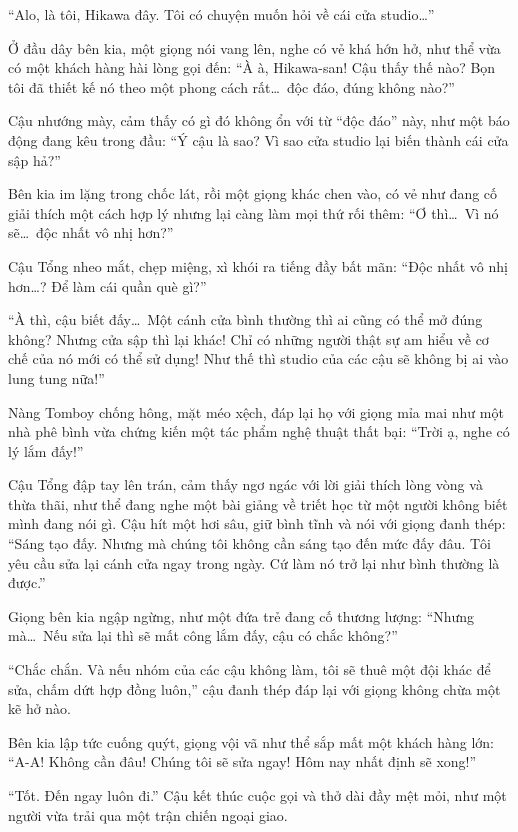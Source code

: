 \documentclass[../main.tex]{subfiles}
\begin{document}
``Alo, là tôi, Hikawa đây. Tôi có chuyện muốn hỏi về cái cửa studio\dots''

Ở đầu dây bên kia, một giọng nói vang lên, nghe có vẻ khá hớn hở, như thể vừa có một khách hàng hài lòng gọi đến: ``À à, Hikawa-san! Cậu thấy thế nào? Bọn tôi đã thiết kế nó theo một phong cách rất\dots\ độc đáo, đúng không nào?''

Cậu nhướng mày, cảm thấy có gì đó không ổn với từ ``độc đáo'' này, như một báo động đang kêu trong đầu: ``Ý cậu là sao? Vì sao cửa studio lại biến thành cái cửa sập hả?''

Bên kia im lặng trong chốc lát, rồi một giọng khác chen vào, có vẻ như đang cố giải thích một cách hợp lý nhưng lại càng làm mọi thứ rối thêm: ``Ơ thì\dots\ Vì nó sẽ\dots\ độc nhất vô nhị hơn?''

Cậu Tổng nheo mắt, chẹp miệng, xì khói ra tiếng đầy bất mãn: ``Độc nhất vô nhị hơn\dots? Để làm cái quần què gì?''

``À thì, cậu biết đấy\dots\ Một cánh cửa bình thường thì ai cũng có thể mở đúng không? Nhưng cửa sập thì lại khác! Chỉ có những người thật sự am hiểu về cơ chế của nó mới có thể sử dụng! Như thế thì studio của các cậu sẽ không bị ai vào lung tung nữa!''

Nàng Tomboy chống hông, mặt méo xệch, đáp lại họ với giọng mỉa mai như một nhà phê bình vừa chứng kiến một tác phẩm nghệ thuật thất bại: ``Trời ạ, nghe có lý lắm đấy!''

Cậu Tổng đập tay lên trán, cảm thấy ngơ ngác với lời giải thích lòng vòng và thừa thãi, như thể đang nghe một bài giảng về triết học từ một người không biết mình đang nói gì. Cậu hít một hơi sâu, giữ bình tĩnh và nói với giọng đanh thép: ``Sáng tạo đấy. Nhưng mà chúng tôi không cần sáng tạo đến mức đấy đâu. Tôi yêu cầu sửa lại cánh cửa ngay trong ngày. Cứ làm nó trở lại như bình thường là được.''

Giọng bên kia ngập ngừng, như một đứa trẻ đang cố thương lượng: ``Nhưng mà\dots\ Nếu sửa lại thì sẽ mất công lắm đấy, cậu có chắc không?''

``Chắc chắn. Và nếu nhóm của các cậu không làm, tôi sẽ thuê một đội khác để sửa, chấm dứt hợp đồng luôn,'' cậu đanh thép đáp lại với giọng không chừa một kẽ hở nào.

Bên kia lập tức cuống quýt, giọng vội vã như thể sắp mất một khách hàng lớn: ``A-A! Không cần đâu! Chúng tôi sẽ sửa ngay! Hôm nay nhất định sẽ xong!''

``Tốt. Đến ngay luôn đi.'' Cậu kết thúc cuộc gọi và thở dài đầy mệt mỏi, như một người vừa trải qua một trận chiến ngoại giao.
\end{document}
